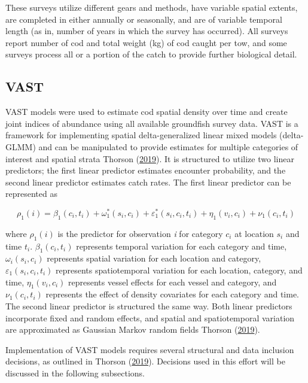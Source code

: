 \documentclass[
]{article}
\begin{document}
These surveys utilize different gears and methods, have variable spatial extents, are completed in either annually or seasonally, and are of variable temporal length (as in, number of years in which the survey has occurred). All surveys report number of cod and total weight (kg) of cod caught per tow, and some surveys process all or a portion of the catch to provide further biological detail.

\hypertarget{vast}{%
\subsection{VAST}\label{vast}}

VAST models were used to estimate cod spatial density over time and create joint indices of abundance using all available groundfish survey data. VAST is a framework for implementing spatial delta-generalized linear mixed models (delta-GLMM) and can be manipulated to provide estimates for multiple categories of interest and spatial strata Thorson (\protect\hyperlink{ref-thorson_2019}{2019}). It is structured to utilize two linear predictors; the first linear predictor estimates encounter probability, and the second linear predictor estimates catch rates. The first linear predictor can be represented as

\[\rho_1(i) = \beta_1(c_i, t_i) + \omega_1^*(s_i, c_i) + \varepsilon_1^*(s_i, c_i, t_i) + \eta_1(v_i, c_i) + \nu_1(c_i, t_i)\]

where \(\rho_1(i)\) is the predictor for observation \emph{i} for category \(c_i\) at location \(s_i\) and time \(t_i\). \(\beta_1(c_i, t_i)\) represents temporal variation for each category and time, \(\omega_i(s_i, c_i)\) represents spatial variation for each location and category, \(\varepsilon_1(s_i, c_i, t_i)\) represents spatiotemporal variation for each location, category, and time, \(\eta_1(v_i, c_i)\) represents vessel effects for each vessel and category, and \(\nu_1(c_i, t_i)\) represents the effect of density covariates for each category and time. The second linear predictor is structured the same way. Both linear predictors incorporate fixed and random effects, and spatial and spatiotemporal variation are approximated as Gaussian Markov random fields Thorson (\protect\hyperlink{ref-thorson_2019}{2019}).

Implementation of VAST models requires several structural and data inclusion decisions, as outlined in Thorson (\protect\hyperlink{ref-thorson_2019}{2019}). Decisions used in this effort will be discussed in the following subsections.
\end{document}
